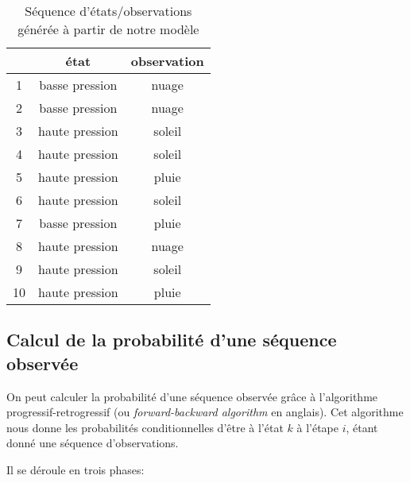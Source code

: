 \documentclass{article}
\begin{document}
\begin{multicols}{2}
\begin{table}[H]
    \begin{center}
        \centering
        \captionsetup{justification=centering}
        \caption{\label{tab:hmmSeq}Séquence d'états/observations générée à partir de notre modèle}
        \begin{tabular}{|c|c|c|}
            \hline
            & état & observation \\
            \hline
            1 & basse pression & nuage \\
            2 & basse pression & nuage \\
            3 & haute pression & soleil \\
            4 & haute pression & soleil \\
            5 & haute pression & pluie \\
            6 & haute pression & soleil \\
            7 & basse pression & pluie \\
            8 & haute pression & nuage \\
            9 & haute pression & soleil \\
            10 & haute pression & pluie \\
            \hline
        \end{tabular}
    \end{center}
\end{table}

\subsection{Calcul de la probabilité d'une séquence observée}

On peut calculer la probabilité d'une séquence observée grâce à l'algorithme
progressif-retrogressif (ou \emph{forward-backward algorithm} en anglais). Cet
algorithme nous donne les probabilités conditionnelles d'être à l'état $k$ à
l'étape $i$, étant donné une séquence d'observations.

Il se déroule en trois phases:


\end{multicols}
\end{document}
